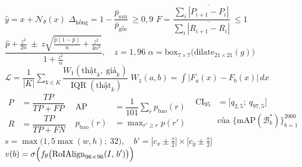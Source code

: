 \documentclass[border=1.5pt,multi=eqn]{standalone}
\newenvironment{eqn}[1]{\fontsize{18}{22}\selectfont\color[HTML]{#1}$\displaystyle}{$}
\begin{document}
\begin{eqn}{0E2238}\hat y=x+\mathcal{N}_{\theta}(x)\end{eqn}
\begin{eqn}{0E2238}\Delta_{\text{hồng}}=1-\dfrac{\bar p_{\text{sau}}}{\bar p_{\text{gốc}}}\ \ge 0{,}9\end{eqn}
\begin{eqn}{0E2238}F=\dfrac{\sum_i\overline{|P_{i+1}-P_i|}}{\sum_i\overline{|R_{i+1}-R_i|}}\ \le 1\end{eqn}
\begin{eqn}{0E2238}\dfrac{\hat p+\frac{z^{2}}{2n}\ \pm\ z\sqrt{\frac{\hat p(1-\hat p)}{n}+\frac{z^{2}}{4n^{2}}}}{1+\frac{z^{2}}{n}},\quad z=1{,}96\end{eqn}
\begin{eqn}{0E2238}\alpha=\mathrm{box}_{7\times7}\bigl(\mathrm{dilate}_{21\times21}(g)\bigr)\end{eqn}
\begin{eqn}{0E2238}\mathcal{L}=\dfrac{1}{|K|}\sum_{k\in K}\dfrac{W_1(\text{thật}_k,\ \text{giả}_k)}{\operatorname{IQR}(\text{thật}_k)}\end{eqn}
\begin{eqn}{0E2238}W_1(a,b)=\int\bigl|F_a(x)-F_b(x)\bigr|\,dx\end{eqn}
\begin{eqn}{0E2238}\begin{aligned}P&=\dfrac{TP}{TP+FP}\\ R&=\dfrac{TP}{TP+FN}\end{aligned}\end{eqn}
\begin{eqn}{0E2238}\begin{aligned}\mathrm{AP}&=\dfrac{1}{101}\sum_{r}p_{\text{bao}}(r)\\ p_{\text{bao}}(r)&=\max_{r'\ge r}p(r')\end{aligned}\end{eqn}
\begin{eqn}{0E2238}\begin{aligned}\mathrm{CI}_{95}&=\bigl[q_{2{,}5};\ q_{97{,}5}\bigr]\\ &\text{của }\bigl\{\mathrm{mAP}(\mathcal{B}^{*}_{b})\bigr\}_{b=1}^{2000}\end{aligned}\end{eqn}
\begin{eqn}{0E2238}s=\max\bigl(1{,}5\max(w,h);\ 32\bigr),\quad b'=\bigl[c_x\pm\tfrac{s}{2}\bigr]\times\bigl[c_y\pm\tfrac{s}{2}\bigr]\end{eqn}
\begin{eqn}{0E2238}v(b)=\sigma\Bigl(f_\theta\bigl(\mathrm{RoIAlign}_{96\times96}(I,\,b')\bigr)\Bigr)\end{eqn}
\end{document}
